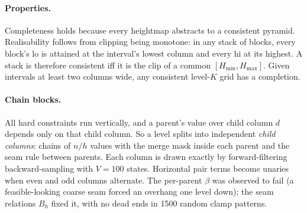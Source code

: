 \documentclass[11pt]{article}
\newcommand{\1}{\mathds{1}}
\begin{document}
\paragraph{Properties.} Completeness holds because every heightmap abstracts to a consistent
pyramid. Realisability follows from clipping being monotone: in any stack of blocks, every
block's lo is attained at the interval's lowest column and every hi at its highest. A stack is
therefore consistent iff it is the clip of a common $[H_{\min}, H_{\max}]$. Given intervals at
least two columns wide, any consistent level-$K$ grid has a completion.

\paragraph{Chain blocks.} All hard constraints run vertically, and a parent's value over child
column $d$ depends only on that child column. So a level splits into independent \emph{child
columns}: chains of $n/h$ values with the merge mask inside each parent and the seam rule
between parents. Each column is drawn exactly by forward-filtering backward-sampling with
$V = 100$ states. Horizontal pair terms become unaries when even and odd columns alternate.
The per-parent $\beta$ was observed to fail (a feasible-looking coarse seam forced an overhang
one level down); the seam relations $B_h$ fixed it, with no dead ends in 1500 random clamp
patterns.
\end{document}

